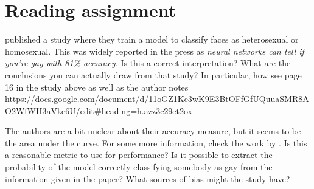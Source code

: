 \section{Reading assignment}

\citet{wang2017deep} published a study where they train a model to classify faces as heterosexual or homosexual. This was widely reported in the press as \emph{neural networks can tell if you're gay with 81\% accuracy.} Is this a correct interpretation? What are the conclusions you can actually draw from that study? In particular, how see page 16 in the study above as well as the author notes \url{https://docs.google.com/document/d/11oGZ1Ke3wK9E3BtOFfGfUQuuaSMR8AO2WfWH3aVke6U/edit#heading=h.azz3c29et2ox}

The authors are a bit unclear about their accuracy measure, but it
seems to be the area under the curve. For some more information, check
the work by \citet{bengio2005expected}. Is this a reasonable metric to
use for performance? Is it possible to extract the probability of the
model correctly classifying somebody as gay from the information given
in the paper?  What sources of bias might the study have?



 
